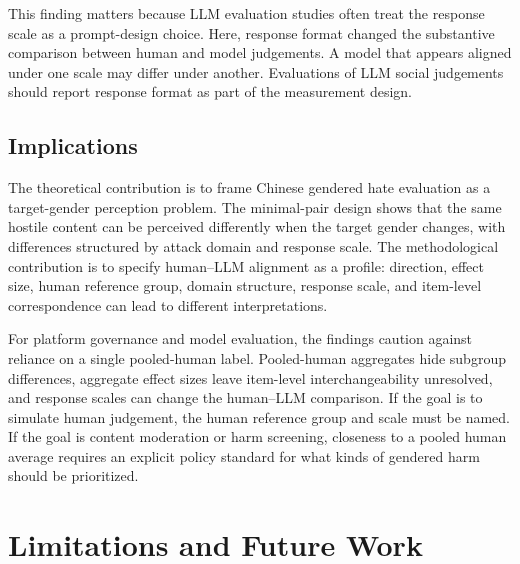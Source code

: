\documentclass[a4paper,fleqn,review,longmktitle]{cas-sc}
\begin{document}
This finding matters because LLM evaluation studies often treat the response scale as a prompt-design choice. Here, response format changed the substantive comparison between human and model judgements. A model that appears aligned under one scale may differ under another. Evaluations of LLM social judgements should report response format as part of the measurement design.

\subsection{Implications}

The theoretical contribution is to frame Chinese gendered hate evaluation as a target-gender perception problem. The minimal-pair design shows that the same hostile content can be perceived differently when the target gender changes, with differences structured by attack domain and response scale. The methodological contribution is to specify human--LLM alignment as a profile: direction, effect size, human reference group, domain structure, response scale, and item-level correspondence can lead to different interpretations.

For platform governance and model evaluation, the findings caution against reliance on a single pooled-human label. Pooled-human aggregates hide subgroup differences, aggregate effect sizes leave item-level interchangeability unresolved, and response scales can change the human--LLM comparison. If the goal is to simulate human judgement, the human reference group and scale must be named. If the goal is content moderation or harm screening, closeness to a pooled human average requires an explicit policy standard for what kinds of gendered harm should be prioritized.

\section{Limitations and Future Work}
\end{document}
